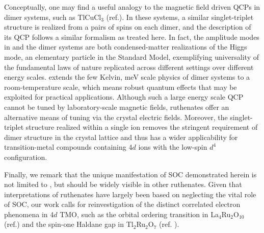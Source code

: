 Conceptually, one may find a useful analogy to the magnetic field driven QCPs in dimer systems, such as TlCuCl$_3$ (ref.\cite{R_egg_2003}). In these systems, a similar singlet-triplet structure is realized from a pairs of spins on each dimer, and the description of its QCP follows a similar formalism as treated here. In fact, the amplitude modes in \CRO and the dimer systems \cite{R_egg_2008}are both condensed-matter realizations of the Higgs mode\cite{Endres_2012,Pollet_2012}, an elementary particle in the Standard Model, exemplifying universality of the fundamental laws of nature replicated across different settings over different energy scales. \CRO extends the few Kelvin, meV scale physics of dimer systems to a room-temperature scale, which means robust quantum effects that may be exploited for practical applications. Although such a large energy scale QCP cannot be tuned by laboratory-scale magnetic fields, ruthenates offer an alternative means of tuning via the crystal electric fields. Moreover, the singlet-triplet structure realized within a single ion removes the stringent requirement of dimer structure in the crystal lattice and thus has a wider applicability for transition-metal compounds containing 4$d$ ions with the low-spin $d^4$ configuration.
  
Finally, we remark that the unique manifestation of SOC demonstrated herein is not limited to \CROns, but should be widely visible in other ruthenates. Given that interpretations of ruthenates have largely been based on neglecting the vital role of SOC, our work calls for reinvestigation of the distinct correlated electron phenomena in 4$d$ TMO, such as the orbital ordering transition in La$_4$Ru$_2$O$_{10}$ (ref.\cite{Khalifah_2002}) and the spin-one Haldane gap in Tl$_2$Ru$_2$O$_7$ (ref.\cite{Lee_2006} ).
  
  
  
  
  
  
  
  
  
  
  
  